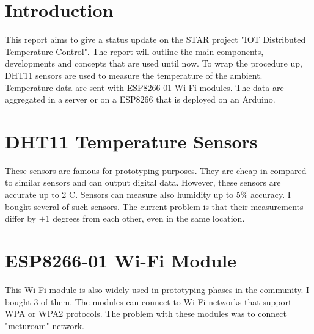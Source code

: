 \documentclass[a4paper,12pt]{article}
\begin{document}
	




\section{Introduction}
This report aims to give a status update on the STAR project "IOT Distributed Temperature Control". The report will outline the main components, developments and concepts that are used until now. To wrap the procedure up, DHT11 sensors are used to measure the temperature of the ambient. Temperature data are sent with ESP8266-01 Wi-Fi modules. The data are aggregated in a server or on a ESP8266 that is deployed on an Arduino.
\section{DHT11 Temperature Sensors}
These sensors are famous for prototyping purposes. They are cheap in compared to similar sensors and can output digital data. However, these sensors \cite{ref-dht11} are accurate up to 2 \degree C. Sensors can measure also humidity up to 5\% accuracy. I bought several of such sensors. The current problem is that their measurements differ by $\pm$1 degrees from each other, even in the same location.

\section{ESP8266-01 Wi-Fi Module}
This Wi-Fi module is also widely used in prototyping phases in the community. I bought 3 of them. The modules can connect to Wi-Fi networks that support WPA or WPA2 protocols. The problem with these modules was to connect "meturoam" network. 
\end{document}
